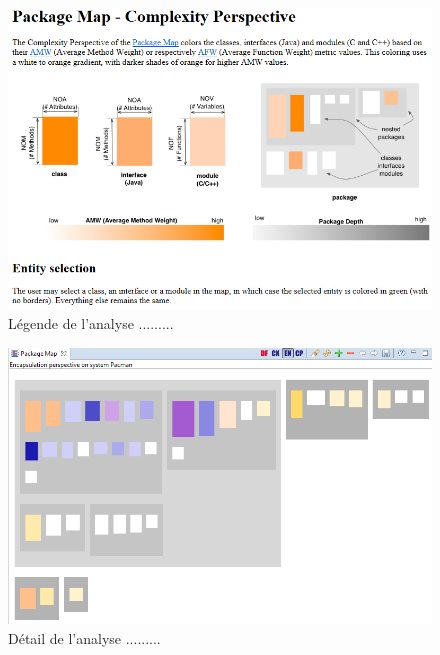 \documentclass[12pt,a4paper,final]{article}
\begin{document}
\begin{figure}
	\centering
	\includegraphics[width=\textwidth]{images/InCodeComplexityLegende.png}
	\caption{\label{incodeComplLeg}Légende de l'analyse .........}
\end{figure}

\begin{figure}
	\centering
	\includegraphics[width=\textwidth]{images/InCodeEncapsulation.png}
	\caption{\label{incodeEnc}Détail de l'analyse .........}
\end{figure}
\end{document}
